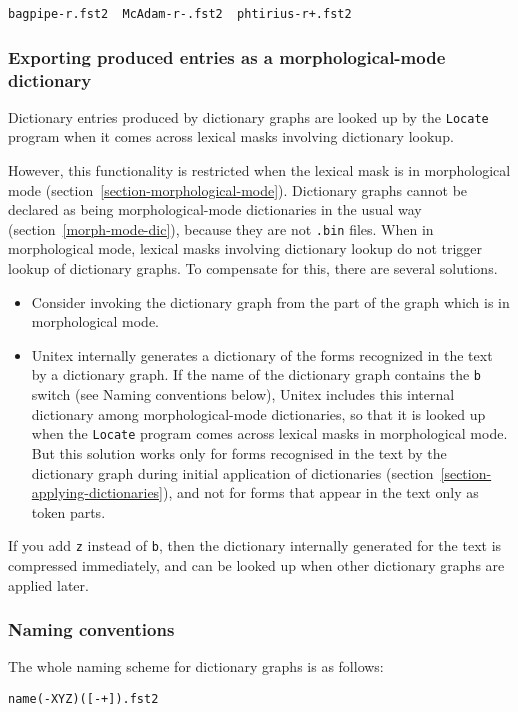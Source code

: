 \bigskip
\verb?bagpipe-r.fst2  McAdam-r-.fst2  phtirius-r+.fst2?

\subsubsection{Exporting produced entries as a morphological-mode dictionary}
Dictionary entries produced by dictionary graphs are looked up 
by the \verb+Locate+ program when it comes across lexical masks involving dictionary lookup.

\bigskip
\noindent However, this functionality is restricted when the lexical mask is
in morphological mode (section~\ref{section-morphological-mode}).
Dictionary graphs cannot be declared as being morphological-mode 
dictionaries in the usual way (section~\ref{morph-mode-dic}), because they are not \verb+.bin+ files.
When in morphological mode, lexical masks involving dictionary lookup do not trigger lookup of dictionary graphs.
To compensate for this, there are several solutions.
\begin{itemize}
\item Consider invoking the dictionary graph from the part of the graph which is in morphological mode.
\item Unitex internally generates a dictionary of the forms recognized in the text by a dictionary graph.
If the name of the dictionary graph contains the \verb+b+ switch (see Naming conventions below),
Unitex includes this internal dictionary among morphological-mode dictionaries, so that it is looked up
when the \verb+Locate+ program comes across lexical masks in morphological mode. But this
solution works only for forms recognised in the text by the dictionary graph during initial application
 of dictionaries (section~\ref{section-applying-dictionaries}), and not for forms that appear in the text only as token parts.
\end{itemize}
If you add \verb+z+ instead of \verb+b+, then the dictionary internally generated for the text
is compressed immediately, and  can be looked up when other dictionary graphs are applied later.
 
\subsubsection{Naming conventions}
The whole naming scheme for dictionary graphs is as follows:

\verb$name(-XYZ)([-+]).fst2$

